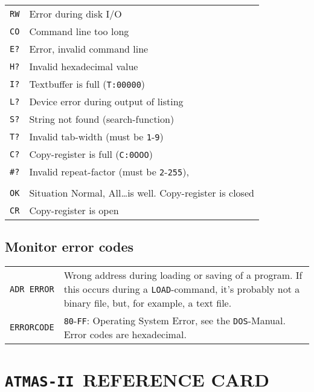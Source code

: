 \documentclass[10pt,a4paper,twoside,final,openright,titlepage]{memoir}
\def\atmas{\texttt{AT\-MAS-II }}
\begin{document}
\renewcommand{\arraystretch}{1.2}
\begin{longtable}{lp{25em}}
\texttt{RW} & Error during disk I/O \\
\texttt{CO} & Command line too long \\
\texttt{E?} & Error, invalid command line \\
\texttt{H?} & Invalid hexadecimal value \\
\texttt{I?} & Textbuffer is full (\texttt{T:00000}) \\
\texttt{L?} & Device error during output of listing \\
\texttt{S?} & String not found (search-function) \\
\texttt{T?} & Invalid tab-width (must be \texttt{1}-\texttt{9}) \\
\texttt{C?} & Copy-register is full (\texttt{C:0OOO}) \\
\texttt{\#?} & Invalid repeat-factor (must be \texttt{2}-\texttt{255}), \\
 & \\
\texttt{OK} & Situation Normal, All\dots is well. Copy-register is closed \\
\texttt{CR} & Copy-register is open \\
\end{longtable}
\renewcommand{\arraystretch}{1.8}
\bigskip

\section{Monitor error codes}

\begin{longtable}{p{5em}p{25em}}
\texttt{ADR ERROR} & Wrong address during loading or saving of a program.
	If this occurs during a \texttt{LOAD}-command, it's probably not a binary file, but, for example, a text file.\\

\texttt{ERRORCODE} & \texttt{80}-\texttt{FF}: Operating System Error, see the \texttt{DOS}-Manual.
		Error codes are hexadecimal. \\
\end{longtable}

\chapter{\atmas REFERENCE CARD}
\end{document}
